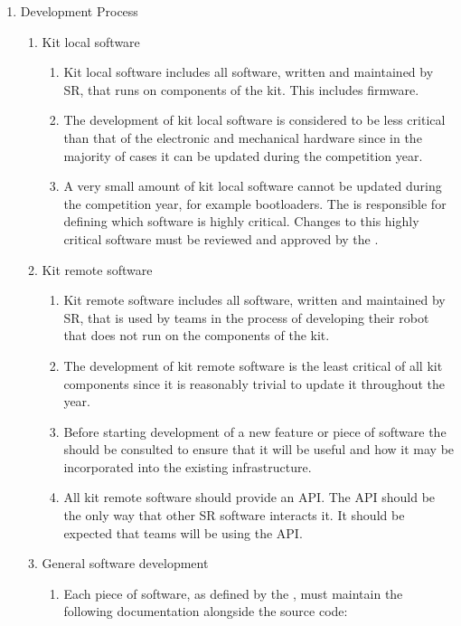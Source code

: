 \begin{draft}
\begin{enumerate}

\item Development Process
  \begin{enumerate}
    \item Kit local software
      \begin{enumerate}
        \item Kit local software includes all software, written and maintained by SR, that runs on components of the kit. This includes firmware.
        \item The development of kit local software is considered to be less critical than that of the electronic and mechanical hardware since in the majority of cases it can be updated during the competition year.
        \item A very small amount of kit local software cannot be updated during the competition year, for example bootloaders. The  is responsible for defining which software is highly critical. Changes to this highly critical software must be reviewed and approved by the .
      \end{enumerate}
    \item Kit remote software
      \begin{enumerate}
        \item Kit remote software includes all software, written and maintained by SR, that is used by teams in the process of developing their robot that does not run on the components of the kit.
        \item The development of kit remote software is the least critical of all kit components since it is reasonably trivial to update it throughout the year.
        \item Before starting development of a new feature or piece of software the  should be consulted to ensure that it will be useful and how it may be incorporated into the existing infrastructure.
        \item All kit remote software should provide an API. The API should be the only way that other SR software interacts it. It should be expected that teams will be using the API.
      \end{enumerate}
    \item General software development
      \begin{enumerate}
        \item Each piece of software, as defined by the , must maintain the following documentation alongside the source code:

\end{enumerate}
\end{enumerate}
\end{enumerate}
\end{draft}
